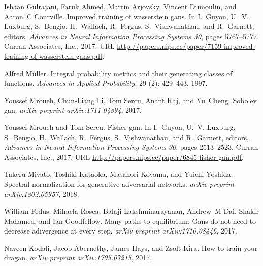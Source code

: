 \documentclass{article}
\begin{document}
\begin{thebibliography}{25}
	Ishaan Gulrajani, Faruk Ahmed, Martin Arjovsky, Vincent Dumoulin, and Aaron~C
	Courville.
	\newblock Improved training of wasserstein gans.
	\newblock In I.~Guyon, U.~V. Luxburg, S.~Bengio, H.~Wallach, R.~Fergus,
	S.~Vishwanathan, and R.~Garnett, editors, \emph{Advances in Neural
		Information Processing Systems 30}, pages 5767--5777. Curran Associates,
	Inc., 2017.
	\newblock URL
	\url{http://papers.nips.cc/paper/7159-improved-training-of-wasserstein-gans.pdf}.
	
	Alfred M{\"u}ller.
	\newblock Integral probability metrics and their generating classes of
	functions.
	\newblock \emph{Advances in Applied Probability}, 29 (2):
	429--443, 1997.
	
	Youssef Mroueh, Chun-Liang Li, Tom Sercu, Anant Raj, and Yu~Cheng.
	\newblock Sobolev gan.
	\newblock \emph{arXiv preprint arXiv:1711.04894}, 2017.
	
	Youssef Mroueh and Tom Sercu.
	\newblock Fisher gan.
	\newblock In I.~Guyon, U.~V. Luxburg, S.~Bengio, H.~Wallach, R.~Fergus,
	S.~Vishwanathan, and R.~Garnett, editors, \emph{Advances in Neural
		Information Processing Systems 30}, pages 2513--2523. Curran Associates,
	Inc., 2017.
	\newblock URL \url{http://papers.nips.cc/paper/6845-fisher-gan.pdf}.
	
	Takeru Miyato, Toshiki Kataoka, Masanori Koyama, and Yuichi Yoshida.
	\newblock Spectral normalization for generative adversarial networks.
	\newblock \emph{arXiv preprint arXiv:1802.05957}, 2018.
	
	William Fedus, Mihaela Rosca, Balaji Lakshminarayanan, Andrew~M Dai, Shakir
	Mohamed, and Ian Goodfellow.
	\newblock Many paths to equilibrium: Gans do not need to decrease adivergence
	at every step.
	\newblock \emph{arXiv preprint arXiv:1710.08446}, 2017.
	
	Naveen Kodali, Jacob Abernethy, James Hays, and Zsolt Kira.
	\newblock How to train your dragan.
	\newblock \emph{arXiv preprint arXiv:1705.07215}, 2017.
	

\end{thebibliography}
\end{document}
